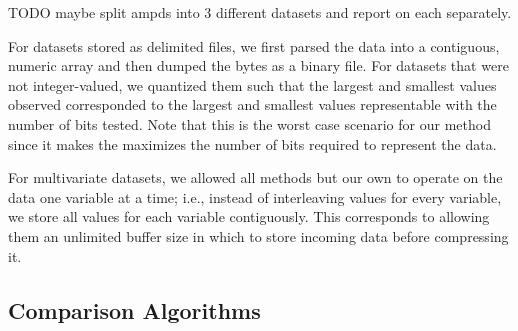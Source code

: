 TODO maybe split ampds into 3 different datasets and report on each separately.

For datasets stored as delimited files, we first parsed the data into a contiguous, numeric array and then dumped the bytes as a binary file. For datasets that were not integer-valued, we quantized them such that the largest and smallest values observed corresponded to the largest and smallest values representable with the number of bits tested. Note that this is the worst case scenario for our method since it makes the maximizes the number of bits required to represent the data.

For multivariate datasets, we allowed all methods but our own to operate on the data one variable at a time; i.e., instead of interleaving values for every variable, we store all values for each variable contiguously. This corresponds to allowing them an unlimited buffer size in which to store incoming data before compressing it.



\subsection{Comparison Algorithms}

